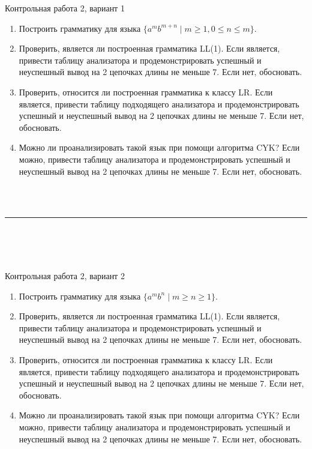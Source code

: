 \documentclass[12pt]{article}
\begin{document}

{\Large Контрольная работа 2, вариант 1}
\bigskip



\begin{enumerate}
  \item Построить грамматику для языка $\{ a^m b^{m+n} \mid m \geq 1, 0 \leq n \leq m \}$.
  
  \item Проверить, является ли построенная грамматика LL(1). Если является, привести таблицу анализатора и продемонстрировать успешный и неуспешный вывод на 2 цепочках длины не меньше 7. Если нет, обосновать. 
  \item Проверить, относится ли построенная грамматика к классу LR. Если является, привести таблицу подходящего анализатора и продемонстрировать успешный и неуспешный вывод на 2 цепочках длины не меньше 7. Если нет, обосновать.
  \item Можно ли проанализировать такой язык при помощи алгоритма CYK? Если можно, привести таблицу анализатора и продемонстрировать успешный и неуспешный вывод на 2 цепочках длины не меньше 7. Если нет, обосновать.
\end{enumerate}

\bigskip

~\\~

\bigskip

\rule{\textwidth}{1pt}

\bigskip

~\\~\\~

\bigskip


{\Large Контрольная работа 2, вариант 2}
\bigskip

\begin{enumerate}
  \item Построить грамматику для языка $\{ a^m b^n \mid m \geq n \geq 1 \}$.
  \item Проверить, является ли построенная грамматика LL(1). Если является, привести таблицу анализатора и продемонстрировать успешный и неуспешный вывод на 2 цепочках длины не меньше 7. Если нет, обосновать. 
  \item Проверить, относится ли построенная грамматика к классу LR. Если является, привести таблицу подходящего анализатора и продемонстрировать успешный и неуспешный вывод на 2 цепочках длины не меньше 7. Если нет, обосновать.
  \item Можно ли проанализировать такой язык при помощи алгоритма CYK? Если можно, привести таблицу анализатора и продемонстрировать успешный и неуспешный вывод на 2 цепочках длины не меньше 7. Если нет, обосновать.
\end{enumerate}
\end{document}
